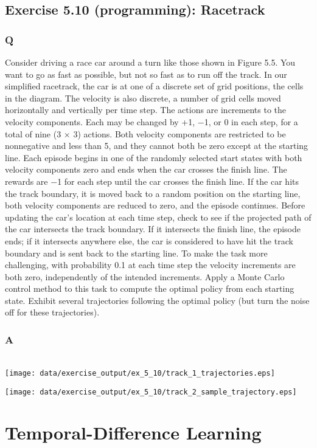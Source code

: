 \subsection{Exercise 5.10 (programming): Racetrack}
\subsubsection{Q}
Consider driving a race car around a turn like those shown in Figure 5.5. You want to go as fast as possible, but not so fast as to run off the track. In our simplified racetrack, the car is at one of a discrete set of grid positions, the cells in the diagram. The velocity is also discrete, a number of grid cells moved horizontally and vertically per time step. The actions are increments to the velocity components. Each may be changed by +1, −1, or 0 in each step, for a total of nine (3 × 3) actions. Both velocity components are restricted to be nonnegative and less than 5, and they cannot both be zero except at the starting line. Each episode begins in one of the randomly selected start states with both velocity components zero and ends when the car crosses the finish line. The rewards are −1 for each step until the car crosses the finish line. If the car hits the track boundary, it is moved back to a random position on the starting line, both velocity components are reduced to zero, and the episode continues. Before updating the car’s location at each time step, check to see if the projected path of the car intersects the track boundary. If it intersects the finish line, the episode ends; if it intersects anywhere else, the car is considered to have hit the track boundary and is sent back to the starting line. To make the task more challenging, with probability 0.1 at each time step the velocity increments are both zero, independently of the intended increments. Apply a Monte Carlo control method to this task to compute the optimal policy from each starting state. Exhibit several trajectories following the optimal policy (but turn the noise off for these trajectories).
\subsubsection{A}
\ProgrammingExercise\\
\texttt{[image: data/exercise\_output/ex\_5\_10/track\_1\_trajectories.eps]}

\texttt{[image: data/exercise\_output/ex\_5\_10/track\_2\_sample\_trajectory.eps]}



\clearpage
\section{Temporal-Difference Learning}

